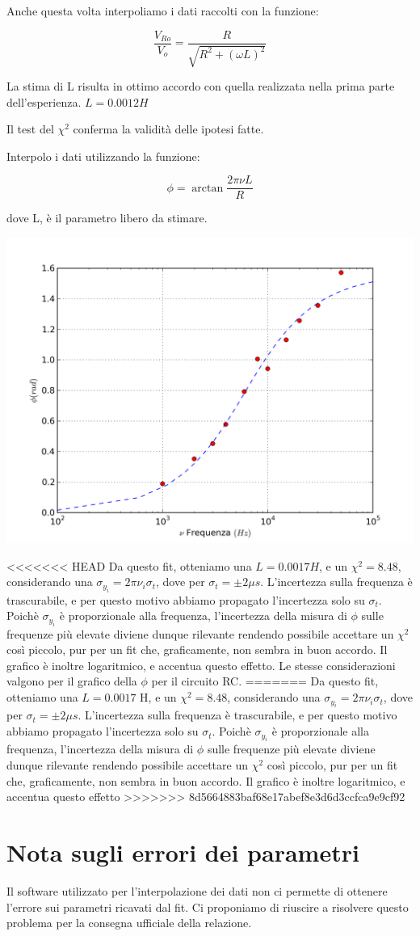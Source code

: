 Anche questa volta interpoliamo i dati raccolti con la funzione:

$$\frac{V_{Ro}}{V_o} = \frac{R}{\sqrt{R^2+(\omega L)^2}}$$

La stima di L risulta in ottimo accordo con quella realizzata nella prima parte dell'esperienza.
$L=0.0012 H $

Il test del $\chi^2$ conferma la validità delle ipotesi fatte.

Interpolo i dati utilizzando la funzione:

$$ \phi = \arctan \frac{2\pi\nu L}{R} $$

dove L, è il parametro libero da stimare.


\begin{center}
 \includegraphics[scale=0.70]{grafici/C3/faseindu.png}
\end{center}

<<<<<<< HEAD
Da questo fit, otteniamo una $L=0.0017 H$, e un $\chi^2 = 8.48 $, considerando una $\sigma_{y_i} = 2 \pi \nu_i \sigma_{t}$, dove  per $\sigma_t = \pm 2 \mu s$. L'incertezza sulla frequenza è trascurabile, e per questo motivo abbiamo propagato l'incertezza solo su $\sigma_t$. Poichè $\sigma_{y_i}$ è proporzionale alla frequenza, l'incertezza della misura di $\phi$ sulle frequenze più elevate diviene dunque rilevante rendendo possibile accettare un $\chi^2$ così piccolo, pur per un fit che, graficamente, non sembra in buon accordo. Il grafico è inoltre logaritmico, e accentua questo effetto. Le stesse considerazioni valgono per il grafico della $\phi$ per il circuito RC.
=======
Da questo fit, otteniamo una $L=0.0017$ H, e un $\chi^2 = 8.48 $, considerando una $\sigma_{y_i} = 2 \pi \nu_i \sigma_{t}$, dove  per $\sigma_t = \pm 2 \mu s$. L'incertezza sulla frequenza è trascurabile, e per questo motivo abbiamo propagato l'incertezza solo su $\sigma_t$. Poichè $\sigma_{y_i}$ è proporzionale alla frequenza, l'incertezza della misura di $\phi$ sulle frequenze più elevate diviene dunque rilevante rendendo possibile accettare un $\chi^2$ così piccolo, pur per un fit che, graficamente, non sembra in buon accordo. Il grafico è inoltre logaritmico, e accentua questo effetto
>>>>>>> 8d5664883baf68e17abef8e3d6d3ccfca9e9cf92
 

\section{Nota sugli errori dei parametri}
Il software utilizzato per l'interpolazione dei dati non ci permette di ottenere l'errore sui parametri ricavati dal fit. Ci proponiamo di riuscire a risolvere questo problema per la consegna ufficiale della relazione.
